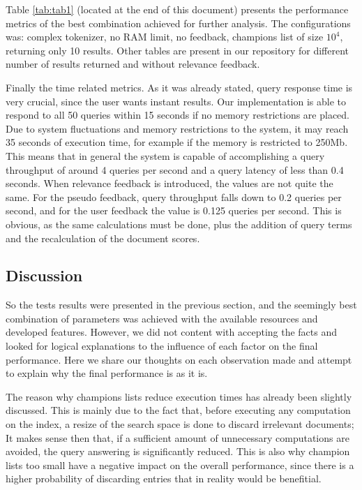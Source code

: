 \documentclass[12pt]{article}
\begin{document}
Table \ref{tab:tab1} (located at the end of this document) presents the performance 
metrics of the best combination achieved for further analysis.
The configurations was: complex tokenizer, no RAM limit, no feedback, champions list of
size $10^4$, returning only 10 results.
Other tables are present in our repository for different number of results returned 
and without relevance feedback.

Finally the time related metrics. 
As it was already stated, query response time is very crucial, since the user wants 
instant results.
Our implementation is able to respond to all 50 queries within 15 seconds if no 
memory restrictions are placed. 
Due to system fluctuations and memory restrictions to the system, it may reach 
35 seconds of execution time, for example if the memory is restricted to 250Mb.
This means that in general the system is capable of accomplishing a query 
throughput of around 4 queries per second and a query latency of less than 0.4 seconds.
When relevance feedback is introduced, the values are not quite the same.
For the pseudo feedback, query throughput falls down to 0.2 queries per second,
and for the user feedback the value is 0.125 queries per second.
This is obvious, as the same calculations must be done, plus the addition of query 
terms and the recalculation of the document scores.

\subsection{Discussion}\label{discussion}

So the tests results were presented in the previous section, and the seemingly
best combination of parameters was achieved with the available resources and 
developed features.
However, we did not content with accepting the facts and looked for logical
explanations to the influence of each factor on the final performance.
Here we share our thoughts on each observation made and attempt to explain why
the final performance is as it is.

The reason why champions lists reduce execution times has already been slightly 
discussed. 
This is mainly due to the fact that, before executing any computation on the index,
a resize of the search space is done to discard irrelevant documents;
It makes sense then that, if a sufficient amount of unnecessary computations are 
avoided, the query answering is significantly reduced.
This is also why champion lists too small have a negative impact on the overall 
performance, since there is a higher probability of discarding entries that in 
reality would be benefitial.
\end{document}
